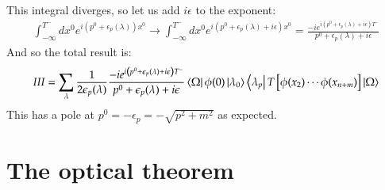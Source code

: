 \documentclass{article}
\begin{document}
This integral diverges, so let us add $i\epsilon$ to the exponent:
\begin{equation}
\begin{gathered}
    \int_{-\infty}^{T^{-}}dx^0 e^{i\left(p^0 + \epsilon_p(\lambda)\right)x^0} \rightarrow \int_{-\infty}^{T^{-}}dx^0 e^{i\left(p^0 + \epsilon_p(\lambda) + i\epsilon\right)x^0} = \frac{-ie^{i\left(p^0 + \epsilon_p(\lambda) + i\epsilon\right)T^{-}}}{p^0 + \epsilon_p(\lambda) + i\epsilon}
\end{gathered}
\end{equation}
And so the total result is:
\begin{equation}
    III = \sum_{\lambda}
    \frac{1}{2\epsilon_p(\lambda)}
    \frac{-ie^{i\left(p^0 + \epsilon_p(\lambda) + i\epsilon\right)T^{-}}}{p^0 + \epsilon_p(\lambda) + i\epsilon}
    \bra{\Omega}\phi(0)\ket{\lambda_0}\bra{\lambda_p}T\left[\phi(x_2)\cdots\phi(x_{n+m})\right]\ket{\Omega}
\end{equation}
This has a pole at $p^0 = -\epsilon_p = -\sqrt{p^2 + m^2}$ as expected.

\newpage
\section{The optical theorem}
\end{document}
